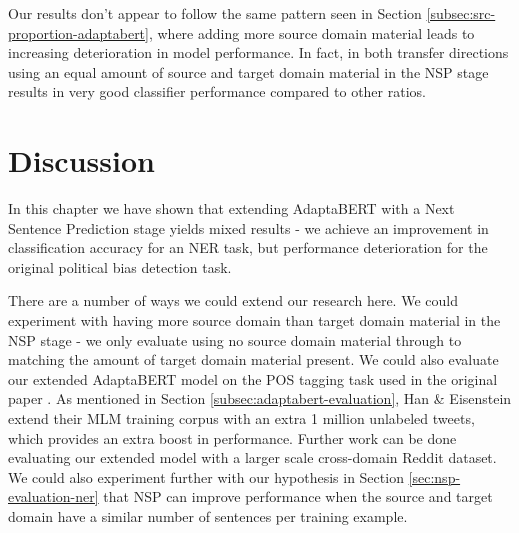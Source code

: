 Our results don't appear to follow the same pattern seen in Section \ref{subsec:src-proportion-adaptabert}, where adding more source domain material leads to increasing deterioration in model performance. In fact, in both transfer directions using an equal amount of source and target domain material in the NSP stage results in very good classifier performance compared to other ratios.

\section{Discussion}

In this chapter we have shown that extending AdaptaBERT with a Next Sentence Prediction stage yields mixed results - we achieve an improvement in classification accuracy for an NER task, but performance deterioration for the original political bias detection task.

There are a number of ways we could extend our research here. We could experiment with having more source domain than target domain material in the NSP stage - we only evaluate using no source domain material through to matching the amount of target domain material present. We could also evaluate our extended AdaptaBERT model on the POS tagging task used in the original paper \cite{adaptabert}. As mentioned in Section \ref{subsec:adaptabert-evaluation}, Han \& Eisenstein extend their MLM training corpus with an extra 1 million unlabeled tweets, which provides an extra boost in performance. Further work can be done evaluating our extended model with a larger scale cross-domain Reddit dataset. We could also experiment further with our hypothesis in Section \ref{sec:nsp-evaluation-ner} that NSP can improve performance when the source and target domain have a similar number of sentences per training example.